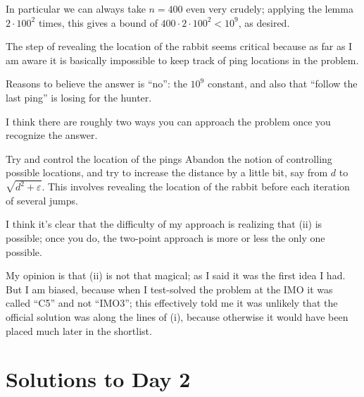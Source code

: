 In particular we can always take $n = 400$ even very crudely;
applying the lemma $2 \cdot 100^2$ times,
this gives a bound of $400 \cdot 2 \cdot 100^2 < 10^9$, as desired.

\begin{remark*}
  The step of revealing the location of the rabbit seems
  critical because as far as I am aware it is basically
  impossible to keep track of ping locations in the problem.
\end{remark*}

\begin{remark*}
  Reasons to believe the answer is ``no'':
  the $10^9$ constant,
  and also that ``follow the last ping'' is losing for the hunter.
\end{remark*}

\begin{remark*}
  I think there are roughly two ways you can approach the problem
  once you recognize the answer.

  \begin{enumerate}[(i)]
    \ii Try and control the location of the pings
    \ii Abandon the notion of controlling possible locations,
    and try to increase the distance by a little bit,
    say from $d$ to $\sqrt{d^2+\varepsilon}$.
    This involves revealing the location of the rabbit
    before each iteration of several jumps.
  \end{enumerate}
  I think it's clear that the difficulty of
  my approach is realizing that (ii) is possible;
  once you do, the two-point approach is more or less the only one possible.

  My opinion is that (ii) is not that magical;
  as I said it was the first idea I had.
  But I am biased, because when I test-solved the problem
  at the IMO it was called ``C5'' and not ``IMO3'';
  this effectively told me it was unlikely that the official solution
  was along the lines of (i),
  because otherwise it would have been placed much later in the shortlist.
\end{remark*}
\pagebreak

\section{Solutions to Day 2}